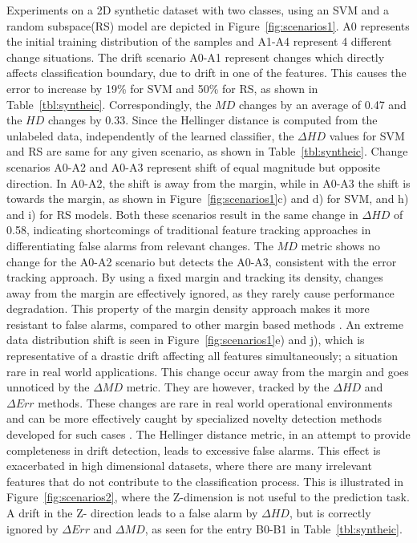 \documentclass[authoryear,3p,times,twocolumn]{elsarticle}
\begin{document}
Experiments on a 2D synthetic dataset with two classes, using an SVM and a random subspace(RS) model are depicted in Figure~\ref{fig:scenarios1}. A0 represents the initial training distribution of the samples and A1-A4 represent 4 different change situations. The drift scenario A0-A1 represent changes which directly affects classification boundary, due to drift in one of the features. This causes the error to increase by 19\% for SVM and 50\% for RS, as shown in Table~\ref{tbl:syntheic}. Correspondingly, the $MD$ changes by an average of 0.47 and the $HD$ changes by 0.33. Since the Hellinger distance is computed from the unlabeled data, independently of the learned classifier, the $\Delta HD$ values for SVM and RS are same for any given scenario, as shown in Table~\ref{tbl:syntheic}. Change scenarios A0-A2 and A0-A3 represent shift of equal magnitude but opposite direction. In A0-A2, the shift is away from the margin, while in A0-A3 the shift is towards the margin, as shown in Figure~\ref{fig:scenarios1}c) and d) for SVM, and h) and i) for RS models. Both these scenarios result in the same change in $\Delta HD$ of 0.58, indicating shortcomings of traditional feature tracking approaches in differentiating false alarms from relevant changes. The $MD$ metric shows no change for the A0-A2 scenario but detects the A0-A3, consistent with the error tracking approach. By using a fixed margin and tracking its density, changes away from the margin are effectively ignored, as they rarely cause performance degradation. This property of the margin density approach makes it more resistant to false alarms, compared to other margin based methods \citep{dries2009adaptive,zliobaite2010change}. An extreme data distribution shift is seen in Figure~\ref{fig:scenarios1}e) and j), which is representative of a drastic drift affecting all features simultaneously; a situation rare in real world applications. This change occur away from the margin and goes unnoticed by the $\Delta MD$  metric. They are however, tracked by the $\Delta HD$ and $\Delta Err$ methods. These changes are rare in real world operational environments and can be more effectively caught by specialized novelty detection methods developed for such cases  \citep{masud2011classification, farid2013adaptive}. The Hellinger distance metric, in an attempt to provide completeness in drift detection, leads to excessive false alarms. This effect is exacerbated in high dimensional datasets, where there are many irrelevant features that do not contribute to the classification process. This is illustrated in Figure~\ref{fig:scenarios2}, where the Z-dimension is not useful to the prediction task. A drift in the Z- direction leads to a false alarm by $\Delta HD$, but is correctly ignored by $\Delta Err$ and $\Delta MD$, as seen for the entry B0-B1 in Table~\ref{tbl:syntheic}. 
\end{document}
